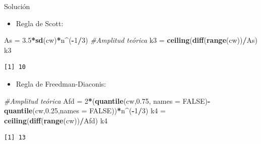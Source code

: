 \documentclass[
  ignorenonframetext,
]{beamer}
\newenvironment{Shaded}{\begin{snugshade}}{\end{snugshade}}
\newcommand{\CommentTok}[1]{\textcolor[rgb]{0.56,0.35,0.01}{\textit{#1}}}
\newcommand{\DataTypeTok}[1]{\textcolor[rgb]{0.13,0.29,0.53}{#1}}
\newcommand{\DecValTok}[1]{\textcolor[rgb]{0.00,0.00,0.81}{#1}}
\newcommand{\FloatTok}[1]{\textcolor[rgb]{0.00,0.00,0.81}{#1}}
\newcommand{\KeywordTok}[1]{\textcolor[rgb]{0.13,0.29,0.53}{\textbf{#1}}}
\newcommand{\NormalTok}[1]{#1}
\newcommand{\OperatorTok}[1]{\textcolor[rgb]{0.81,0.36,0.00}{\textbf{#1}}}
\newcommand{\OtherTok}[1]{\textcolor[rgb]{0.56,0.35,0.01}{#1}}
\newcommand{\StringTok}[1]{\textcolor[rgb]{0.31,0.60,0.02}{#1}}
\providecommand{\tightlist}{%
  \setlength{\itemsep}{0pt}\setlength{\parskip}{0pt}}
\begin{document}
\begin{frame}[fragile]{Solución}
\protect\hypertarget{soluciuxf3n-2}{}

\begin{itemize}
\tightlist
\item
  Regla de Scott:
\end{itemize}

\begin{Shaded}
\begin{Highlighting}[]
\NormalTok{As =}\StringTok{ }\FloatTok{3.5}\OperatorTok{*}\KeywordTok{sd}\NormalTok{(cw)}\OperatorTok{*}\NormalTok{n}\OperatorTok{^}\NormalTok{(}\OperatorTok{-}\DecValTok{1}\OperatorTok{/}\DecValTok{3}\NormalTok{) }\CommentTok{#Amplitud teórica}
\NormalTok{k3 =}\StringTok{ }\KeywordTok{ceiling}\NormalTok{(}\KeywordTok{diff}\NormalTok{(}\KeywordTok{range}\NormalTok{(cw))}\OperatorTok{/}\NormalTok{As)}
\NormalTok{k3}
\end{Highlighting}
\end{Shaded}

\begin{verbatim}
[1] 10
\end{verbatim}

\begin{itemize}
\tightlist
\item
  Regla de Freedman-Diaconis:
\end{itemize}

\begin{Shaded}
\begin{Highlighting}[]
\CommentTok{#Amplitud teórica}
\NormalTok{Afd =}\StringTok{ }\DecValTok{2}\OperatorTok{*}\NormalTok{(}\KeywordTok{quantile}\NormalTok{(cw,}\FloatTok{0.75}\NormalTok{, }\DataTypeTok{names =} \OtherTok{FALSE}\NormalTok{)}\OperatorTok{-}\KeywordTok{quantile}\NormalTok{(cw,}\FloatTok{0.25}\NormalTok{,}\DataTypeTok{names =} \OtherTok{FALSE}\NormalTok{))}\OperatorTok{*}\NormalTok{n}\OperatorTok{^}\NormalTok{(}\OperatorTok{-}\DecValTok{1}\OperatorTok{/}\DecValTok{3}\NormalTok{) }
\NormalTok{k4 =}\StringTok{ }\KeywordTok{ceiling}\NormalTok{(}\KeywordTok{diff}\NormalTok{(}\KeywordTok{range}\NormalTok{(cw))}\OperatorTok{/}\NormalTok{Afd)}
\NormalTok{k4}
\end{Highlighting}
\end{Shaded}

\begin{verbatim}
[1] 13
\end{verbatim}

\end{frame}
\end{document}
